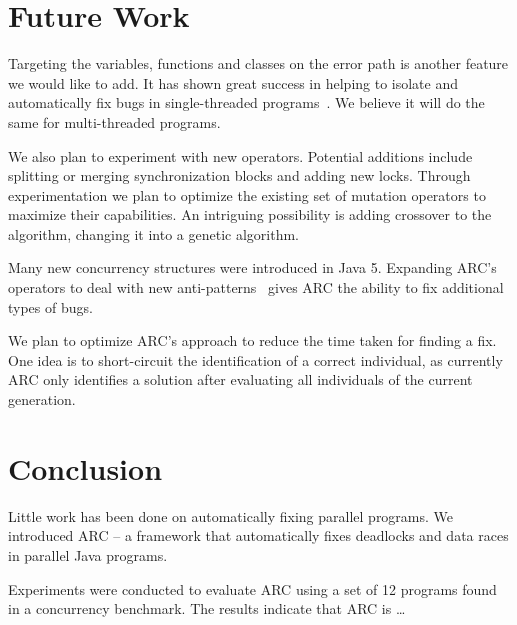 \documentclass{llncs}
\begin{document}
\section{Future Work}
\label{sec:future_work}

Targeting the variables, functions and classes on the error path is another
feature we would like to add. It has shown great success in helping to isolate
and automatically fix bugs in single-threaded programs~\cite{FNWG09, NWLF09,
WFGN10, GNFW11}. We believe it will do the same for multi-threaded programs.

We also plan to experiment with new operators. Potential additions include
splitting or merging synchronization blocks and adding new locks. Through
experimentation we plan to optimize the existing set of mutation operators to
maximize their capabilities.  An intriguing possibility is adding crossover to
the algorithm, changing it into a genetic algorithm.

Many new concurrency structures were introduced in Java 5. Expanding ARC's
operators to deal with new anti-patterns~\cite{BJ09, FKLV12, BCD06} gives ARC
the ability to fix additional types of bugs.

We plan to optimize ARC's approach to reduce the time taken for finding a fix.
One idea is to short-circuit the identification of a correct individual, as
currently ARC only identifies a solution after evaluating all individuals of
the current generation.

\section{Conclusion}
\label{sec:conclusion}

Little work has been done on automatically fixing parallel programs. We
introduced ARC -- a framework that automatically fixes deadlocks and data races
in parallel Java programs.

Experiments were conducted to evaluate ARC using a set of 12 programs found in
a concurrency benchmark. The results indicate that ARC is \ldots %



\end{document}
